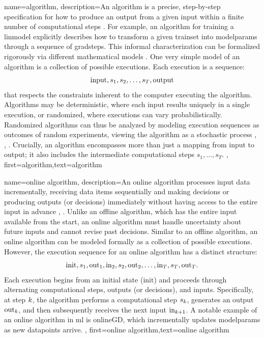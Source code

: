 {name={algorithm},
  description={An algorithm is a precise, step-by-step specification for 
  	how to produce an output from a given input within a finite number of computational steps \cite{Cormen:2022aa}. 
    For example, an algorithm for training a \gls{linmodel} explicitly describes how to 
	transform a given \gls{trainset} into \gls{modelparams} through a sequence of \gls{gradstep}s. 
    This informal characterization can be formalized rigorously via different mathematical \gls{model}s \cite{Sipser2013}. 
    One very simple \gls{model} of an algorithm is a collection of possible executions. Each execution is a sequence:
    $${\rm input},s_1,s_2,\ldots,s_T,{\rm output}$$ 
    that respects the constraints inherent to the computer executing the algorithm.
	Algorithms may be deterministic, where each input results uniquely in a single execution,
	or randomized, where executions can vary probabilistically. Randomized algorithms 
	can thus be analyzed by modeling execution sequences as outcomes of random experiments, 
	viewing the algorithm as a stochastic process \cite{BertsekasProb}, \cite{RandomizedAlgos}, \cite{Gallager13}.
	Crucially, an algorithm encompasses more than just a mapping from input to output; it also includes 
	the intermediate computational steps $s_1,\ldots,s_T$. 
	},
	first={algorithm},text={algorithm} 
}

{name={online algorithm},
	description={An online \gls{algorithm} processes input \gls{data} incrementally, 
		receiving \gls{data} items sequentially and making decisions or producing outputs (or decisions) immediately 
		without having access to the entire input in advance \cite{PredictionLearningGames}, \cite{HazanOCO}. 
		Unlike an offline \gls{algorithm}, which has the entire input available from the start, an online \gls{algorithm} 
		must handle \gls{uncertainty} about future inputs and cannot revise past decisions. Similar to an 
		offline \gls{algorithm}, an online \gls{algorithm} can be modeled formally as a collection of possible 
		executions. However, the execution sequence for an online \gls{algorithm} has a distinct structure:
		$${\rm init},s_1,{\rm out}_{1},{\rm in}_{2},s_2,{\rm out}_{2},\ldots,{\rm in}_{T},s_T,{\rm out}_{T}.$$ 
		Each execution begins from an initial state (\(\text{init}\)) and proceeds through alternating computational steps, 
		outputs (or decisions), and inputs. Specifically, at step \(k\), the \gls{algorithm} performs a computational step 
		\(s_{k}\), generates an output \(\text{out}_{k}\), and then subsequently 
		receives the next input \(\text{in}_{k+1}\). A notable example of an online \gls{algorithm} in \gls{ml} is 
		\gls{onlineGD}, which incrementally updates \gls{modelparams} as new \gls{datapoint}s 
		arrive.
	},
	first={online algorithm},text={online algorithm} 
}



